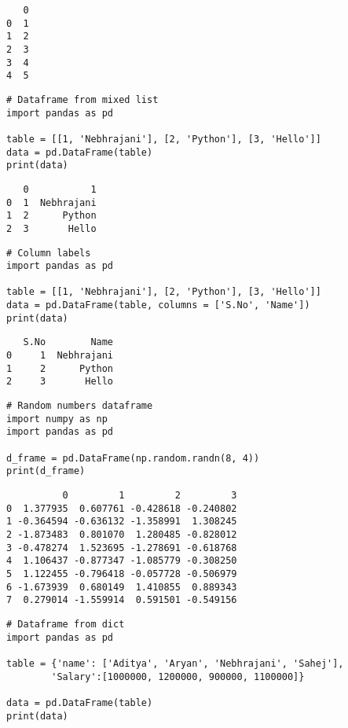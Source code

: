 \documentclass[11pt]{article}
\begin{document}
\begin{verbatim}
   0
0  1
1  2
2  3
3  4
4  5
\end{verbatim}


\begin{verbatim}
# Dataframe from mixed list
import pandas as pd

table = [[1, 'Nebhrajani'], [2, 'Python'], [3, 'Hello']]
data = pd.DataFrame(table)
print(data)
\end{verbatim}

\begin{verbatim}
   0           1
0  1  Nebhrajani
1  2      Python
2  3       Hello
\end{verbatim}


\begin{verbatim}
# Column labels
import pandas as pd

table = [[1, 'Nebhrajani'], [2, 'Python'], [3, 'Hello']]
data = pd.DataFrame(table, columns = ['S.No', 'Name'])
print(data)
\end{verbatim}

\begin{verbatim}
   S.No        Name
0     1  Nebhrajani
1     2      Python
2     3       Hello
\end{verbatim}


\begin{verbatim}
# Random numbers dataframe
import numpy as np
import pandas as pd

d_frame = pd.DataFrame(np.random.randn(8, 4))
print(d_frame)
\end{verbatim}

\begin{verbatim}
          0         1         2         3
0  1.377935  0.607761 -0.428618 -0.240802
1 -0.364594 -0.636132 -1.358991  1.308245
2 -1.873483  0.801070  1.280485 -0.828012
3 -0.478274  1.523695 -1.278691 -0.618768
4  1.106437 -0.877347 -1.085779 -0.308250
5  1.122455 -0.796418 -0.057728 -0.506979
6 -1.673939  0.680149  1.410855  0.889343
7  0.279014 -1.559914  0.591501 -0.549156
\end{verbatim}


\begin{verbatim}
# Dataframe from dict
import pandas as pd

table = {'name': ['Aditya', 'Aryan', 'Nebhrajani', 'Sahej'],
        'Salary':[1000000, 1200000, 900000, 1100000]}

data = pd.DataFrame(table)
print(data)
\end{verbatim}
\end{document}
